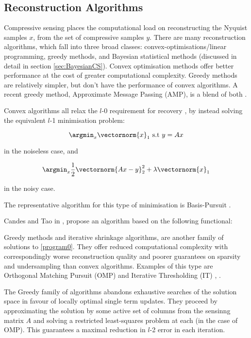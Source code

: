 \subsection{Reconstruction Algorithms}
Compressive sensing places the computational load on reconstructing the Nyquist samples \(x\), from the set of compressive samples \(y\). There are many reconstruction algorithms, which fall into three broad classes: convex-optimisations/linear programming, greedy methods, and Bayesian statistical methods (discussed in detail in section \ref{sec:BayesianCS}). Convex optimisation methods offer better performance at the cost of greater computational complexity. Greedy methods are relatively simpler, but don't have the performance of convex algorithms. A recent greedy method, Approximate Message Passing (AMP), is a blend of both \cite{donoho2009message}.

Convex algorithms all relax the \(l\)-0 requirement for recovery \cite{tropp2006relax}, by instead solving the equivalent \(l\)-1 minimisation problem:

\begin{equation}
\argmin_x \vectornorm{x}_1 \text{ s.t } y=Ax
\end{equation}

in the noiseless case, and 

\begin{equation}
\argmin_x \frac{1}{2}\vectornorm{Ax-y}_2^2 + \lambda\vectornorm{x}_1
\end{equation}

in the noisy case.

The representative algorithm for this type of minimisation is Basis-Pursuit \cite{Chen1998a}. 

Candes and Tao in \cite{candes2007dantzig}, propose an algorithm based on the following functional:



Greedy methods and iterative shrinkage algorithms, are another family of solutions to \ref{program0}. They offer reduced computational complexity with correspondingly worse reconstruction quality and poorer guarantees on sparsity and undersampling than convex algorithms. Examples of this type are Orthogonal Matching Pursuit (OMP)\cite{tropp2007signal} and Iterative Thresholding (IT) \cite{blumensath2009iterative}, \cite{Beck2009}. 

The Greedy family of algorithms abandons exhaustive searches of the solution space in favour of locally optimal single term updates. They proceed by approximating the solution by some active set of columns from the sensinng matrix \(A\) and solving a restricted least-squares problem at each (in the case of OMP). This guarantees a maximal reduction in \(l\)-2 error in each iteration.

